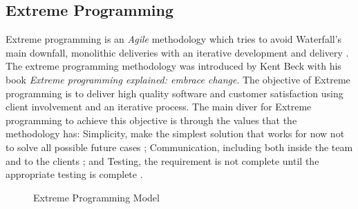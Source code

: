 \documentclass{style/CRPITStyle}
\renewcommand{\cite}{\citep}
\begin{document}
\subsection{Extreme Programming} %

Extreme programming is an \emph{Agile} methodology which tries to avoid
Waterfall's main downfall, monolithic deliveries with an iterative development
and delivery \cite{khramtchenko:2004:xp}.
The extreme programming methodology was introduced by Kent Beck
\cite{beck:2000:xp} with his book \emph{Extreme programming explained: embrace change}.
The objective of Extreme programming is to deliver high quality software and customer satisfaction using
client involvement and an iterative process. The main diver for Extreme programming 
to achieve this objective is through the values that the methodology has:
Simplicity, make the simplest solution that works for now not to solve all possible
future cases ; Communication, including both inside the team and to the clients ; 
and Testing, the requirement is not complete until the appropriate testing is complete \cite{khramtchenko:2004:xp}.

\begin{figure}[htb]
\caption{\protect\label{iid} Extreme Programming Model}
\end{figure}


\paragraph{}
\end{document}
